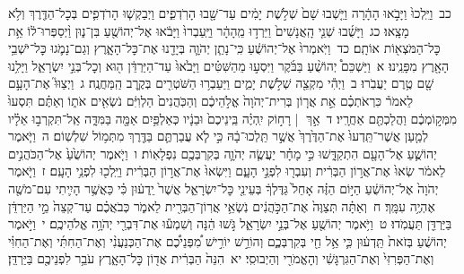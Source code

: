 \documentclass[18pt]{article}
\newcommand{\vart}[1]{\Bfootnote{#1}}	%
\begin{document}
 {\loc כב~}וַיֵּֽלְכוּ֙ וַיָּבֹ֣אוּ הָהָ֔רָה וַיֵּ֤שְׁבוּ שָׁם֙ שְׁלֹ֣שֶׁת יָמִ֔ים עַד־שָׁ֖בוּ הָרֹֽדְפִ֑ים וַיְבַקְשׁ֧וּ הָרֹדְפִ֛ים בְּכׇל־הַדֶּ֖רֶךְ וְלֹ֥א מָצָֽאוּ׃ \startlock
 {\loc כג~}וַיָּשֻׁ֜בוּ שְׁנֵ֤י הָֽאֲנָשִׁים֙ וַיֵּרְד֣וּ מֵֽהָהָ֔ר וַיַּֽעַבְרוּ֙ וַיָּבֹ֔אוּ אֶל־יְהוֹשֻׁ֖עַ בִּן־נ֑וּן וַ֨יְסַפְּרוּ־ל֔וֹ אֵ֥ת כׇּל־הַמֹּצְא֖וֹת אוֹתָֽם׃ \startlock
 {\loc כד~}וַיֹּֽאמְרוּ֙ אֶל־יְהוֹשֻׁ֔עַ כִּֽי־נָתַ֧ן יְהֹוָ֛ה בְּיָדֵ֖נוּ אֶת־כׇּל־הָאָ֑רֶץ וְגַם־נָמֹ֛גוּ כׇּל־יֹשְׁבֵ֥י הָאָ֖רֶץ מִפָּנֵֽינוּ׃ 
\startlock
 {\loc א~}וַיַּשְׁכֵּם֩ יְהוֹשֻׁ֨עַ בַּבֹּ֜קֶר וַיִּסְע֣וּ מֵהַשִּׁטִּ֗ים וַיָּבֹ֙אוּ֙ עַד־הַיַּרְדֵּ֔ן ה֖וּא וְכׇל־בְּנֵ֣י יִשְׂרָאֵ֑ל וַיָּלִ֥נוּ שָׁ֖ם טֶ֥רֶם יַעֲבֹֽרוּ׃ \startlock
 {\loc ב~}וַיְהִ֕י מִקְצֵ֖ה שְׁלֹ֣שֶׁת יָמִ֑ים וַיַּעַבְר֥וּ הַשֹּׁטְרִ֖ים בְּקֶ֥רֶב הַֽמַּחֲנֶֽה׃ \startlock
 {\loc ג~}וַיְצַוּוּ֮ אֶת־הָעָ֣ם לֵאמֹר֒ כִּרְאֹתְכֶ֗ם אֵ֣ת אֲר֤וֹן בְּרִית־יְהֹוָה֙ אֱלֹ֣הֵיכֶ֔ם וְהַכֹּֽהֲנִים֙ הַלְוִיִּ֔ם נֹשְׂאִ֖ים אֹת֑וֹ וְאַתֶּ֗ם תִּסְעוּ֙ מִמְּק֣וֹמְכֶ֔ם וַהֲלַכְתֶּ֖ם אַחֲרָֽיו׃ \startlock
 {\loc ד~}אַ֣ךְ  |  רָח֣וֹק יִֽהְיֶ֗ה בֵּֽינֵיכֶם֙ וּבֵנָ֔יו כְּאַלְפַּ֥יִם אַמָּ֖ה בַּמִּדָּ֑ה אַֽל־תִּקְרְב֣וּ אֵלָ֗יו לְמַ֤עַן אֲשֶׁר־תֵּֽדְעוּ֙ אֶת־הַדֶּ֙רֶךְ֙ אֲשֶׁ֣ר תֵּֽלְכוּ־בָ֔הּ כִּ֣י לֹ֧א עֲבַרְתֶּ֛ם בַּדֶּ֖רֶךְ מִתְּמ֥וֹל שִׁלְשֽׁוֹם׃ \startlock
 {\loc ה~}וַיֹּ֧אמֶר יְהוֹשֻׁ֛עַ אֶל־הָעָ֖ם הִתְקַדָּ֑שׁוּ כִּ֣י מָחָ֗ר יַעֲשֶׂ֧ה יְהֹוָ֛ה בְּקִרְבְּכֶ֖ם נִפְלָאֽוֹת׃ \startlock
 {\loc ו~}וַיֹּ֤אמֶר יְהוֹשֻׁ֙עַ֙ אֶל־הַכֹּהֲנִ֣ים לֵאמֹ֔ר שְׂאוּ֙ אֶת־אֲר֣וֹן הַבְּרִ֔ית וְעִבְר֖וּ לִפְנֵ֣י הָעָ֑ם וַיִּשְׂאוּ֙ אֶת־אֲר֣וֹן הַבְּרִ֔ית וַיֵּֽלְכ֖וּ לִפְנֵ֥י הָעָֽם׃ \startlock
 {\loc ז~}וַיֹּ֤אמֶר יְהֹוָה֙ אֶל־יְהוֹשֻׁ֔עַ הַיּ֣וֹם הַזֶּ֗ה אָחֵל֙ גַּדֶּלְךָ֔ בְּעֵינֵ֖י כׇּל־יִשְׂרָאֵ֑ל אֲשֶׁר֙ יֵֽדְע֔וּן כִּ֗י כַּאֲשֶׁ֥ר הָיִ֛יתִי עִם־מֹשֶׁ֖ה אֶהְיֶ֥ה עִמָּֽךְ׃ \startlock
 {\loc ח~}וְאַתָּ֗ה תְּצַוֶּה֙ אֶת־הַכֹּ֣הֲנִ֔ים נֹֽשְׂאֵ֥י אֲרֽוֹן־הַבְּרִ֖ית לֵאמֹ֑ר כְּבֹאֲכֶ֗ם עַד־קְצֵה֙ מֵ֣י הַיַּרְדֵּ֔ן בַּיַּרְדֵּ֖ן תַּעֲמֹֽדוּ׃ \startlock
 {\loc ט~}וַיֹּ֥אמֶר יְהוֹשֻׁ֖עַ אֶל־בְּנֵ֣י יִשְׂרָאֵ֑ל גֹּ֣שׁוּ הֵ֔נָּה וְשִׁמְע֕וּ אֶת־דִּבְרֵ֖י יְהֹוָ֥ה אֱלֹהֵיכֶֽם׃ \startlock
 {\loc י~}וַיֹּ֣אמֶר יְהוֹשֻׁ֔עַ בְּזֹאת֙ תֵּֽדְע֔וּן כִּ֛י אֵ֥ל חַ֖י בְּקִרְבְּכֶ֑ם וְהוֹרֵ֣שׁ יוֹרִ֣ישׁ מִ֠פְּנֵיכֶ֠ם אֶת־הַכְּנַעֲנִ֨י וְאֶת־הַחִתִּ֜י וְאֶת־הַחִוִּ֗י וְאֶת־הַפְּרִזִּי֙ וְאֶת־הַגִּרְגָּשִׁ֔י וְהָאֱמֹרִ֖י וְהַיְבוּסִֽי׃ \startlock
 {\loc יא~}הִנֵּה֙  \edtext{אֲר֣וֹן}{\vart{מג"ה=אֲר֣ון (תקלדה) | }}  הַבְּרִ֔ית אֲד֖וֹן כׇּל־הָאָ֑רֶץ עֹבֵ֥ר לִפְנֵיכֶ֖ם בַּיַּרְדֵּֽן׃ \startlock
\end{document}
